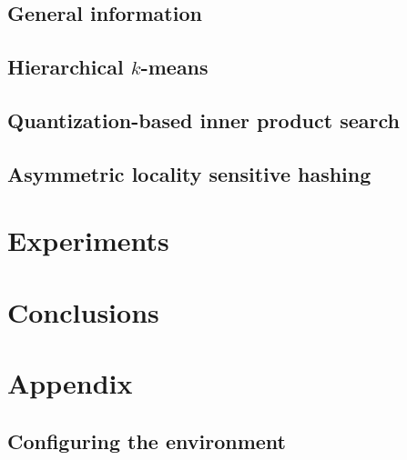 \documentclass[english,bachelor,a4paper,twoside,11pt]{ppfcmthesis}
\begin{document}
	\section{General information}
	
	\section{Hierarchical $k$-means}
	
	\section{Quantization-based inner product search}
	
	\section{Asymmetric locality sensitive hashing}
	
\chapter{Experiments}
	
\chapter{Conclusions}
	


\newpage
\chapter{Appendix}
\section{Configuring the environment}
	

\ppcolophon
\end{document}
